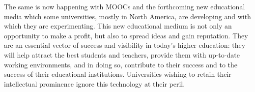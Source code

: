 The same is now happening with MOOCs and the forthcoming
new educational media which some universities, mostly in North America,
are developing and with which they are experimenting. 
This new
educational medium is not only an opportunity to make a profit, but also
to spread ideas and gain reputation. They are an
essential vector of success and visibility in today's higher
education: they will help attract the best students and
teachers, provide them with up-to-date working environments, and in doing
so, contribute to their success and to the success of their educational
institutions.  Universities wishing to retain their intellectual
prominence ignore this technology at their peril.



